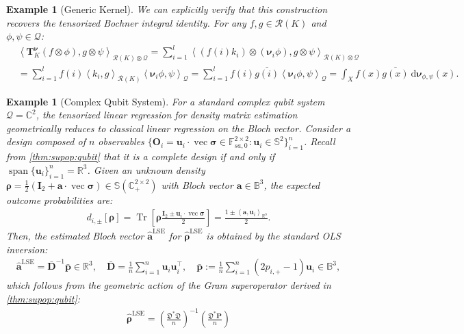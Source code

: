 \documentclass[noinfoline]{imsart}\setcounter{tocdepth}{2}
\renewcommand{\b}[1]{\mathbb{#1}} %
\newcommand{\m}[1]{\mathbf{#1}} %
\newcommand{\f}[1]{\mathfrak{#1}} %
\renewcommand{\c}[1]{\mathcal{#1}} %
\newcommand{\mb}[1]{\boldsymbol{#1}} %
\newcommand{\rd}{\mathrm{d}} %
\newcommand{\tr}[1]{\operatorname{Tr}\left[#1\right]}
\newcommand{\innpr}[2]{{\left\langle {#1},{#2}\right\rangle}} %
\renewcommand{\vec}{\operatorname{vec}}
\DeclareMathOperator*{\spann}{span}
\theoremstyle{plain}
\newtheorem{example}[theorem]{Example}
\begin{document}
\begin{appendix}
\begin{example}[Generic Kernel]
We can explicitly verify that this construction recovers the tensorized Bochner integral identity. For any $f, g \in \c{R}(K)$ and $\phi, \psi \in \c{Q}$:
\begin{align*}
    &\innpr{\m{T}_{K}^{\mb{\nu}} (f \otimes \phi)}{g \otimes \psi}_{\c{R}(K) \otimes \c{Q}} = \sum_{i=1}^{l} \innpr{(f(i) k_{i}) \otimes (\mb{\nu}_{i} \phi)}{g \otimes \psi}_{\c{R}(K) \otimes \c{Q}} \\
    &= \sum_{i=1}^{l} f(i) \innpr{k_{i}}{g}_{\c{R}(K)} \innpr{\mb{\nu}_{i} \phi}{\psi}_{\c{Q}} = \sum_{i=1}^{l} f(i) \overline{g(i)} \innpr{\mb{\nu}_{i} \phi}{\psi}_{\c{Q}} = \int_{X} f(x) \overline{g(x)} \ \rd \mb{\nu}_{\phi, \psi}(x).
\end{align*}
\end{example}

\begin{example}[Complex Qubit System]\label{ex:comp:qubit:LSE}
For a standard complex qubit system $\c{Q} = \b{C}^{2}$, the tensorized linear regression for density matrix estimation geometrically reduces to classical linear regression on the Bloch vector. Consider a design composed of $n$ observables $\{\m{O}_{i} = \m{u}_{i} \cdot \vec{\mb{\sigma}} \in \b{F}_{sa, 0}^{2 \times 2} : \m{u}_{i} \in \b{S}^{2} \}_{i=1}^{n}$. Recall from \cref{thm:supop:qubit} that it is a complete design if and only if $\spann \{\m{u}_{i}\}_{i=1}^{n} = \b{R}^{3}$.
Given an unknown density $\mb{\rho} = \frac{1}{2} (\m{I}_{2} + \m{a} \cdot \vec{\mb{\sigma}}) \in \b{S}(\b{C}_{+}^{2 \times 2})$ with Bloch vector $\m{a} \in \b{B}^{3}$, the expected outcome probabilities are:
\begin{align*}
    d_{i, \pm}[\mb{\rho}] = \tr{\mb{\rho} \frac{\m{I}_{2} \pm \m{u}_{i} \cdot \vec{\mb{\sigma}}}{2}} = \frac{1 \pm \innpr{\m{a}}{\m{u}_{i}}_{\b{R}^{3}}}{2}.
\end{align*}
Then, the estimated Bloch vector $\hat{\m{a}}^{\text{LSE}}$ for $\hat{\mb{\rho}}^{\text{LSE}}$ is obtained by the standard OLS inversion:
\begin{align*}
    \hat{\m{a}}^{\text{LSE}} = \bar{\m{D}}^{-1} \bar{\m{p}} \in \b{R}^{3}, \quad \bar{\m{D}} = \frac{1}{n} \sum_{i=1}^{n} \m{u}_{i} \m{u}_{i}^{\top}, \quad \bar{\m{p}} := \frac{1}{n} \sum_{i=1}^{n} (2 p_{i, +}-1) \m{u}_{i} \in \b{B}^{3},
\end{align*}
which follows from the geometric action of the Gram superoperator derived in \cref{thm:supop:qubit}:
\begin{align*}
    \hat{\mb{\rho}}^{\text{LSE}} = \left( \frac{\f{D}^{*} \f{D}}{n} \right)^{-1} \left(\frac{\f{D}^{*} \m{P}}{n} \right) 

\end{align*}
\end{example}
\end{appendix}
\end{document}
